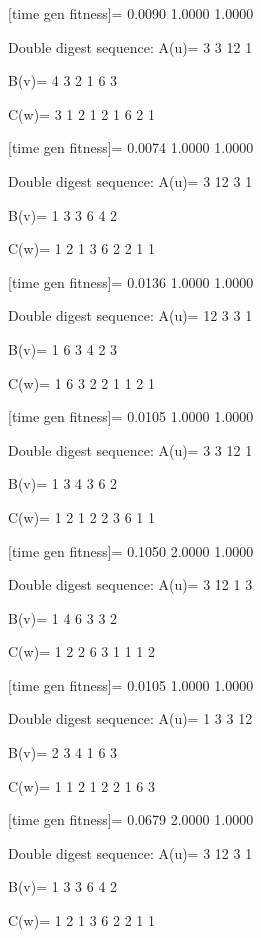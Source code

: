 [time gen fitness]=
    0.0090    1.0000    1.0000

Double digest sequence:
A(u)=
     3     3    12     1

B(v)=
     4     3     2     1     6     3

C(w)=
     3     1     2     1     2     1     6     2     1

[time gen fitness]=
    0.0074    1.0000    1.0000

Double digest sequence:
A(u)=
     3    12     3     1

B(v)=
     1     3     3     6     4     2

C(w)=
     1     2     1     3     6     2     2     1     1

[time gen fitness]=
    0.0136    1.0000    1.0000

Double digest sequence:
A(u)=
    12     3     3     1

B(v)=
     1     6     3     4     2     3

C(w)=
     1     6     3     2     2     1     1     2     1

[time gen fitness]=
    0.0105    1.0000    1.0000

Double digest sequence:
A(u)=
     3     3    12     1

B(v)=
     1     3     4     3     6     2

C(w)=
     1     2     1     2     2     3     6     1     1

[time gen fitness]=
    0.1050    2.0000    1.0000

Double digest sequence:
A(u)=
     3    12     1     3

B(v)=
     1     4     6     3     3     2

C(w)=
     1     2     2     6     3     1     1     1     2

[time gen fitness]=
    0.0105    1.0000    1.0000

Double digest sequence:
A(u)=
     1     3     3    12

B(v)=
     2     3     4     1     6     3

C(w)=
     1     1     2     1     2     2     1     6     3

[time gen fitness]=
    0.0679    2.0000    1.0000

Double digest sequence:
A(u)=
     3    12     3     1

B(v)=
     1     3     3     6     4     2

C(w)=
     1     2     1     3     6     2     2     1     1

